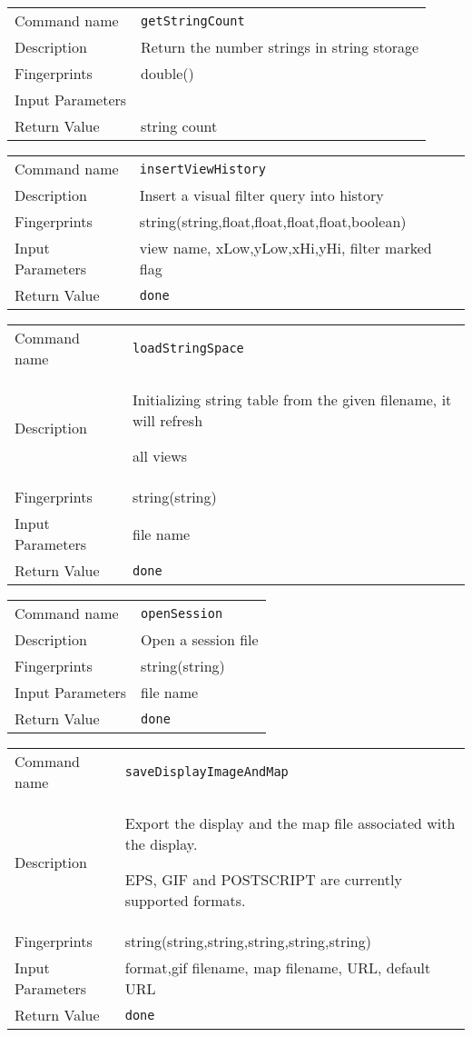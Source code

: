 \noindent
\begin{tabular}{l|p{5in}}
\hline
Command name &{\tt getStringCount }\\ 
Description &
Return the number strings in string storage
 	\\
Fingerprints & double()\\
Input Parameters&\\
Return Value&string count\\
\hline
\end{tabular}
\bigskip

\noindent
\begin{tabular}{l|p{5in}}
\hline
Command name &{\tt insertViewHistory }\\ 
Description &
Insert a visual filter query into history
 	\\
Fingerprints & string(string,float,float,float,float,boolean)\\
Input Parameters&view name, xLow,yLow,xHi,yHi, filter marked flag\\
Return Value&{\tt done}\\
\hline
\end{tabular}
\bigskip

\noindent
\begin{tabular}{l|p{5in}}
\hline
Command name &{\tt loadStringSpace }\\ 
Description &
Initializing string table from the given filename, it will refresh
 
all views
 	\\
Fingerprints & string(string)\\
Input Parameters&file name\\
Return Value&{\tt done}\\
\hline
\end{tabular}
\bigskip

\noindent
\begin{tabular}{l|p{5in}}
\hline
Command name &{\tt openSession }\\ 
Description &
Open a session file
 	\\
Fingerprints & string(string)\\
Input Parameters&file name\\
Return Value&{\tt done}\\
\hline
\end{tabular}
\bigskip

\noindent
\begin{tabular}{l|p{5in}}
\hline
Command name &{\tt saveDisplayImageAndMap }\\ 
Description &
Export the display and the map file associated with the display. 
 
EPS, GIF and POSTSCRIPT are currently supported formats.
 	\\
Fingerprints & string(string,string,string,string,string)\\
Input Parameters&format,gif filename, map filename, URL, default URL\\
Return Value&{\tt done}\\
\hline
\end{tabular}
\bigskip

